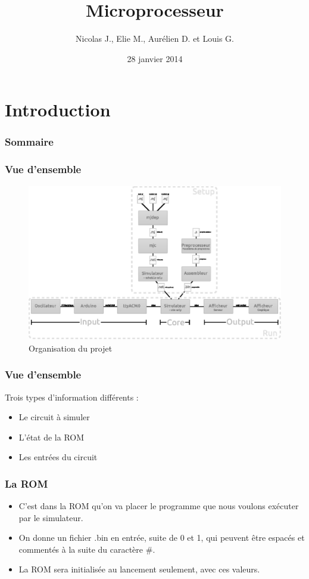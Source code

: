 \documentclass{beamer}
\title{Microprocesseur}
\author{Nicolas J., Elie M., Aurélien D. et Louis G.}
\date{28 janvier 2014}
\begin{document}
\maketitle

\section{Introduction}

\begin{frame}
\frametitle{Sommaire}
  \tableofcontents
\end{frame}


\begin{frame}
\frametitle{Vue d'ensemble}

\begin{figure}[h]
\centering
\includegraphics{organisation.eps}
\caption{\label{orga} Organisation du projet}
\end{figure}
\end{frame}

\begin{frame}
\frametitle{Vue d'ensemble}
Trois types d'information différents :
\begin{itemize}
	\item Le circuit à simuler
	\item L'état de la ROM
	\item Les entrées du circuit
\end{itemize}
\end{frame}

\begin{frame}
\frametitle{La ROM}
\begin{itemize}
	\item C'est dans la ROM qu'on va placer le programme que nous voulons exécuter par le simulateur.
		\item On donne un fichier .bin en entrée, suite de 0 et 1, qui peuvent être espacés et commentés à la suite du caractère $\#$. 
	\item	La ROM sera initialisée au lancement seulement, avec ces valeurs.
\end{itemize}
\end{frame}
\end{document}
